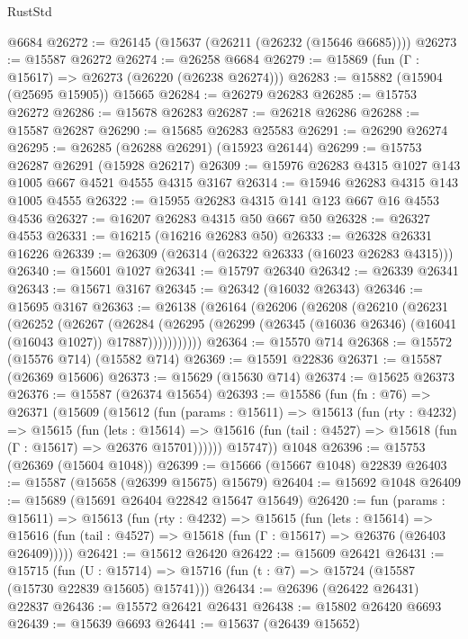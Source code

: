 \begin{lexlean}{RustStd}
\begin{coremodule}
    @6684
@26272 := @26145 (@15637 (@26211 (@26232 (@15646 @6685))))
@26273 := @15587 @26272
@26274 := @26258 @6684
@26279 := @15869 (fun (Γ : @15617) => @26273 (@26220 (@26238 @26274)))
@26283 := @15882 (@15904 (@25695 @15905)) @15665
@26284 := @26279 @26283
@26285 := @15753 @26272
@26286 := @15678 @26283
@26287 := @26218 @26286
@26288 := @15587 @26287
@26290 := @15685 @26283 @25583
@26291 := @26290 @26274
@26295 := @26285 (@26288 @26291) (@15923 @26144)
@26299 := @15753 @26287 @26291 (@15928 @26217)
@26309 := @15976 @26283 @4315 @1027 @143 @1005 @667 @4521 @4555 @4315 @3167
@26314 := @15946 @26283 @4315 @143 @1005 @4555
@26322 := @15955 @26283 @4315 @141 @123 @667 @16 @4553 @4536
@26327 := @16207 @26283 @4315 @50 @667 @50
@26328 := @26327 @4553
@26331 := @16215 (@16216 @26283 @50)
@26333 := @26328 @26331 @16226
@26339 := @26309 (@26314 (@26322 @26333 (@16023 @26283 @4315)))
@26340 := @15601 @1027
@26341 := @15797 @26340
@26342 := @26339 @26341
@26343 := @15671 @3167
@26345 := @26342 (@16032 @26343)
@26346 := @15695 @3167
@26363 := @26138
    (@26164
      (@26206
        (@26208
          (@26210
            (@26231
              (@26252
                (@26267
                  (@26284
                    (@26295
                      (@26299 (@26345 (@16036 @26346) (@16041 (@16043 @1027)) @17887)))))))))))
@26364 := @15570 @714
@26368 := @15572 (@15576 @714) (@15582 @714)
@26369 := @15591 @22836
@26371 := @15587 (@26369 @15606)
@26373 := @15629 (@15630 @714)
@26374 := @15625 @26373
@26376 := @15587 (@26374 @15654)
@26393 := @15586
    (fun (fn : @76) =>
    @26371
      (@15609
        (@15612
          (fun (params : @15611) =>
          @15613
            (fun (rty : @4232) =>
            @15615
              (fun (lets : @15614) =>
              @15616 (fun (tail : @4527) => @15618 (fun (Γ : @15617) => @26376 @15701))))))
        @15747))
    @1048
@26396 := @15753 (@26369 (@15604 @1048))
@26399 := @15666 (@15667 @1048) @22839
@26403 := @15587 (@15658 (@26399 @15675) @15679)
@26404 := @15692 @1048
@26409 := @15689 (@15691 @26404 @22842 @15647 @15649)
@26420 := fun (params : @15611) =>
  @15613
    (fun (rty : @4232) =>
    @15615
      (fun (lets : @15614) =>
      @15616 (fun (tail : @4527) => @15618 (fun (Γ : @15617) => @26376 (@26403 @26409)))))
@26421 := @15612 @26420
@26422 := @15609 @26421
@26431 := @15715
    (fun (U : @15714) => @15716 (fun (t : @7) => @15724 (@15587 (@15730 @22839 @15605) @15741)))
@26434 := @26396 (@26422 @26431) @22837
@26436 := @15572 @26421 @26431
@26438 := @15802 @26420 @6693
@26439 := @15639 @6693
@26441 := @15637 (@26439 @15652)

\end{coremodule}
\end{lexlean}
